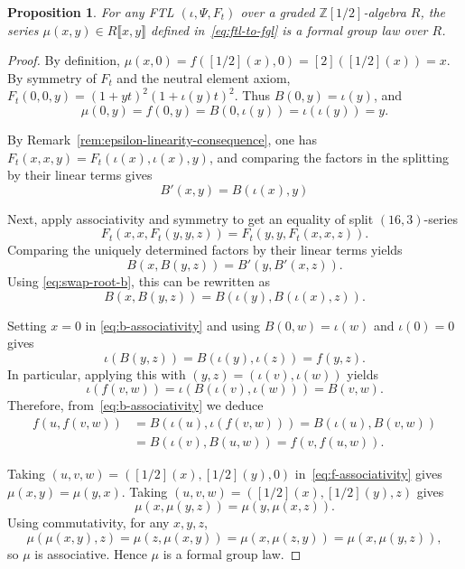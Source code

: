 \documentclass[a4paper]{amsart}
\theoremstyle{plain}
\newtheorem{proposition}[subsubsection]{Proposition}
\theoremstyle{definition}
\newcommand{\ZZ}{\mathbb{Z}}
\begin{document}
\begin{proposition}\label{prop:ftl-to-fgl-is-fgl}
	For any FTL $(\iota, \Psi, F_t)$ over a graded $\ZZ[1/2]$-algebra $R$, the series
	$\mu(x,y)\in R\llbracket x,y\rrbracket$ defined in~\eqref{eq:ftl-to-fgl} is a formal group law over $R$.
\end{proposition}
\begin{proof}
	By definition, $\mu(x,0)=f([1/2](x),0)=[2]([1/2](x))=x$.
	By symmetry of $F_t$ and the neutral element axiom, $F_t(0,0,y)=(1+yt)^2(1+\iota(y)t)^2$. Thus $B(0,y)=\iota(y)$, and
	\[
		\mu(0,y)=f(0,y)=B(0,\iota(y))=\iota(\iota(y))=y.
	\]

	By Remark~\ref{rem:epsilon-linearity-consequence}, one has $F_t(x,x,y)=F_t(\iota(x),\iota(x),y)$, and comparing
	the factors in the splitting by their linear terms gives
	\begin{equation}\label{eq:swap-root-b}
		B'(x,y)=B(\iota(x),y)
	\end{equation}

	Next, apply associativity and symmetry to get an equality of split $(16,3)$-series
	\[
		F_t(x,x,F_t(y,y,z))=F_t(y,y,F_t(x,x,z)).
	\]
	Comparing the uniquely determined factors by their linear terms yields
	\[
		B(x,B(y,z))=B'(y,B'(x,z)).
	\]
	Using \eqref{eq:swap-root-b}, this can be rewritten as
	\begin{equation}\label{eq:b-associativity}
		B(x,B(y,z))=B(\iota(y),B(\iota(x),z)).
	\end{equation}

	Setting $x=0$ in \eqref{eq:b-associativity} and using $B(0,w)=\iota(w)$ and $\iota(0)=0$ gives
	\[
		\iota(B(y,z))=B(\iota(y),\iota(z))=f(y,z).
	\]
	In particular, applying this with $(y,z)=(\iota(v),\iota(w))$ yields
	\[
		\iota(f(v,w))=\iota(B(\iota(v),\iota(w)))=B(v,w).
	\]
	Therefore, from~\eqref{eq:b-associativity} we deduce
	\begin{equation}\label{eq:f-associativity}
		\begin{aligned}
			f(u,f(v,w)) & =B(\iota(u),\iota(f(v,w)))=B(\iota(u),B(v,w)) \\
			            & =B(\iota(v),B(u,w))=f(v,f(u,w)).
		\end{aligned}
	\end{equation}

	Taking $(u,v,w)=([1/2](x),[1/2](y),0)$ in~\eqref{eq:f-associativity} gives $\mu(x,y)=\mu(y,x)$.
	Taking $(u,v,w)=([1/2](x),[1/2](y),z)$ gives
	\[
		\mu(x,\mu(y,z))=\mu(y,\mu(x,z)).
	\]
	Using commutativity, for any $x,y,z$,
	\[
		\mu(\mu(x,y),z)=\mu(z,\mu(x,y))=\mu(x,\mu(z,y))=\mu(x,\mu(y,z)),
	\]
	so $\mu$ is associative. Hence $\mu$ is a formal group law.
\end{proof}
\end{document}
